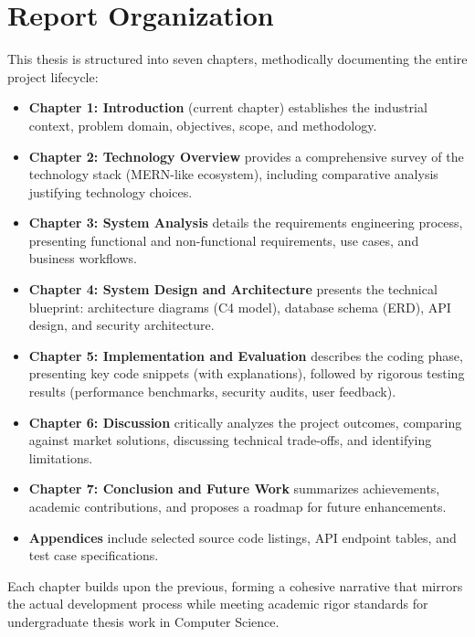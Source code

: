 \documentclass[12pt, a4paper]{report}
\begin{document}
\section{Report Organization}

This thesis is structured into seven chapters, methodically documenting the entire project lifecycle:

\begin{itemize}
    \item \textbf{Chapter 1: Introduction} (current chapter) establishes the industrial context, problem domain, objectives, scope, and methodology.
    
    \item \textbf{Chapter 2: Technology Overview} provides a comprehensive survey of the technology stack (MERN-like ecosystem), including comparative analysis justifying technology choices.
    
    \item \textbf{Chapter 3: System Analysis} details the requirements engineering process, presenting functional and non-functional requirements, use cases, and business workflows.
    
    \item \textbf{Chapter 4: System Design and Architecture} presents the technical blueprint: architecture diagrams (C4 model), database schema (ERD), API design, and security architecture.
    
    \item \textbf{Chapter 5: Implementation and Evaluation} describes the coding phase, presenting key code snippets (with explanations), followed by rigorous testing results (performance benchmarks, security audits, user feedback).
    
    \item \textbf{Chapter 6: Discussion} critically analyzes the project outcomes, comparing against market solutions, discussing technical trade-offs, and identifying limitations.
    
    \item \textbf{Chapter 7: Conclusion and Future Work} summarizes achievements, academic contributions, and proposes a roadmap for future enhancements.
    
    \item \textbf{Appendices} include selected source code listings, API endpoint tables, and test case specifications.
\end{itemize}

Each chapter builds upon the previous, forming a cohesive narrative that mirrors the actual development process while meeting academic rigor standards for undergraduate thesis work in Computer Science.
\end{document}
